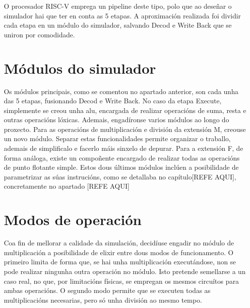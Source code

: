 O procesador RISC-V emprega un pipeline deste tipo, polo que ao deseñar o simulador hai que ter en conta as 5 etapas. A aproximación realizada foi dividir cada etapa en un módulo do simulador, salvando Decod e Write Back que se uniron por comodidade.

\section{Módulos do simulador}\label{sec:modulso_sim}
Os módulos principais, como se comentou no apartado anterior, son cada unha das 5 etapas, fusionando Decod e Write Back. No caso da etapa Execute, simplemente se creou unha \acrshort{alu}, encargada de realizar operacións de suma, resta e outras operacións lóxicas. Ademais, engadíronse varios módulos ao longo do proxecto. Para as operacións de multiplicación e división da extensión M, creouse un novo módulo. Separar estas funcionalidades permite organizar o traballo, ademais de simplificalo e facerlo máis sinxelo de depurar. Para a extensión F, de forma análoga, existe un compoñente encargado de realizar todas as operacións de punto flotante simple. Estos dous últimos módulos inclúen a posibilidade de parametrizar as súas instrucións, como se detallaba no capítulo[REFE AQUI], concretamente no apartado [REFE AQUI]

\section{Modos de operación}\label{sec:modos_op}
Coa fin de mellorar a calidade da simulación, decidíuse engadir no módulo de multiplicación a posibilidade de elixir entre dous modos de funcionamento. O primeiro limita de forma que, se hai unha multiplicación executándose, non se pode realizar ningunha outra operación no módulo. Isto pretende semellarse a un caso real, no que, por limitacións físicas, se empregan os mesmos circuítos para ambas operacións. O segundo modo permite que se executen todas as multiplicacións necesarias, pero só unha división ao mesmo tempo.


